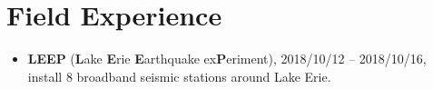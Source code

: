 \section*{Field Experience}
\begin{itemize}
\item \textbf{LEEP} (\textbf{L}ake \textbf{E}rie \textbf{E}arthquake ex\textbf{P}eriment),
      2018/10/12 -- 2018/10/16, install 8 broadband seismic stations around Lake Erie.
\end{itemize}
